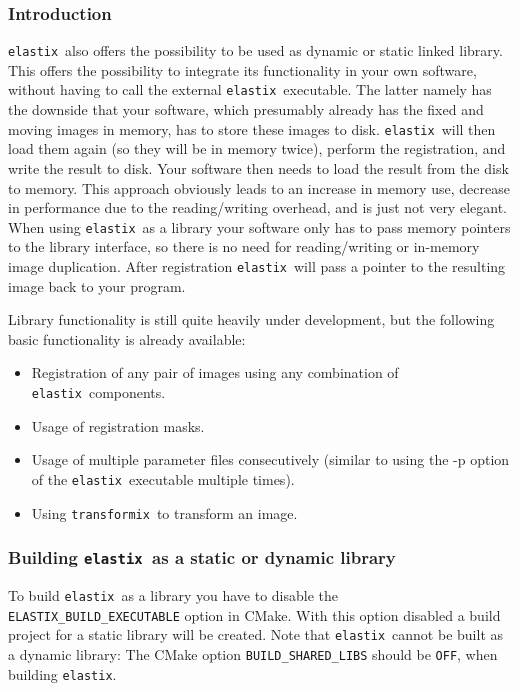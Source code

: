 \documentclass[]{report}
\newcommand{\elastix}{\texttt{elastix}}
\newcommand{\transformix}{\texttt{transformix}}
\begin{document}
\subsubsection{Introduction}

\elastix\ also offers the possibility to be used as dynamic or
static linked library. This offers the possibility to integrate its
functionality in your own software, without having to call the
external \elastix\ executable. The latter namely has the downside
that your software, which presumably already has the fixed and
moving images in memory, has to store these images to disk.
\elastix\ will then load them again (so they will be in memory
twice), perform the registration, and write the result to disk. Your
software then needs to load the result from the disk to memory. This
approach obviously leads to an increase in memory use, decrease in
performance due to the reading/writing overhead, and is just not
very elegant. When using \elastix\ as a library your software only
has to pass memory pointers to the library interface, so there is no
need for reading/writing or in-memory image duplication. After
registration \elastix\ will pass a pointer to the resulting image
back to your program.

Library functionality is still quite heavily under development, but
the following basic functionality is already available:
\begin{itemize}
\item Registration of any pair of images using any combination of
\elastix\ components.

\item Usage of registration masks.

\item Usage of multiple parameter files consecutively (similar to
using the -p option of the \elastix\ executable multiple times).

\item Using \transformix\ to transform an image.
\end{itemize}

\subsubsection{Building \elastix\ as a static or dynamic library}

To build \elastix\ as a library you have to disable the
\texttt{ELASTIX\_BUILD\_EXECUTABLE} option in CMake. With this
option disabled a build project for a static library will be
created. Note that \elastix\ cannot be built as a dynamic library:
The CMake option \texttt{BUILD\_SHARED\_LIBS} should be \texttt{OFF},
when building \elastix.
\end{document}
